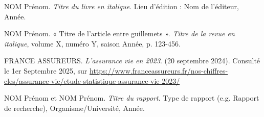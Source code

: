 \newpage %


\begin{thebibliography}{9}

NOM Prénom. \textit{Titre du livre en italique}. Lieu d'édition : Nom de l'éditeur, Année.

NOM Prénom. « Titre de l'article entre guillemets ». \textit{Titre de la revue en italique}, volume X, numéro Y, saison Année, p. 123-456.

FRANCE ASSUREURS. \textit{L'assurance vie en 2023}. (20 septembre 2024). Consulté le 1er Septembre 2025, sur \url{https://www.franceassureurs.fr/nos-chiffres-cles/assurance-vie/etude-statistique-assurance-vie-2023/}

NOM Prénom et NOM Prénom. \textit{Titre du rapport}. Type de rapport (e.g. Rapport de recherche), Organisme/Université, Année.

\end{thebibliography}